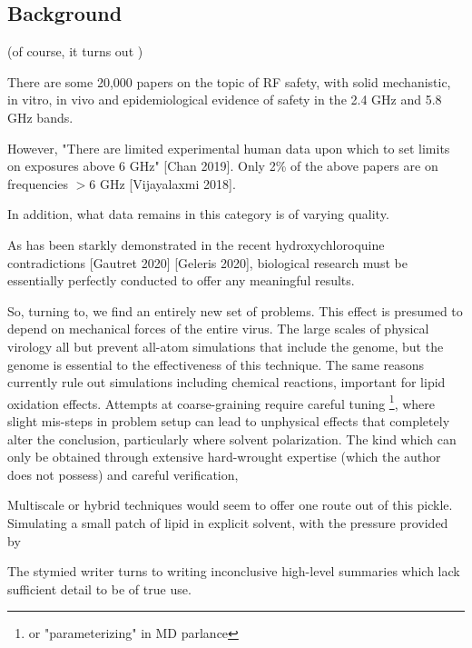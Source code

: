 \documentclass[paper.tex]{subfiles}
\begin{document}
\begin{multicols}{1}

\section{Background}



 (of course, it turns out )


	

There are some 20,000 papers on the topic of RF safety, with solid mechanistic, in vitro, in vivo and epidemiological evidence of safety in the 2.4 GHz and 5.8 GHz bands.

However, "There are limited experimental human data upon which to set limits on exposures above 6 GHz" [Chan 2019]. Only 2\% of the above papers are on frequencies $>6$ GHz [Vijayalaxmi 2018]. 

In addition, what data remains in this category is of varying quality. 



As has been starkly demonstrated in the recent hydroxychloroquine contradictions [Gautret 2020] [Geleris 2020], biological research must be essentially perfectly conducted to offer any meaningful results.

So, turning to, we find an entirely new set of problems. This effect is presumed to depend on mechanical forces of the entire virus. The large scales of physical virology all but prevent all-atom simulations that include the genome, but the genome is essential to the effectiveness of this technique. The same reasons currently rule out simulations including chemical reactions, important for lipid oxidation effects. Attempts at coarse-graining require careful tuning \footnote{or "parameterizing" in MD parlance}, where slight mis-steps in problem setup can lead to unphysical effects that completely alter the conclusion, particularly where solvent polarization. The kind which can only be obtained through extensive hard-wrought expertise (which the author does not possess) and careful verification, 

Multiscale or hybrid techniques would seem to offer one route out of this pickle. Simulating a small patch of lipid in explicit solvent, with the pressure provided by

The stymied writer turns to writing inconclusive high-level summaries which lack sufficient detail to be of true use.














\end{multicols}
\end{document}
